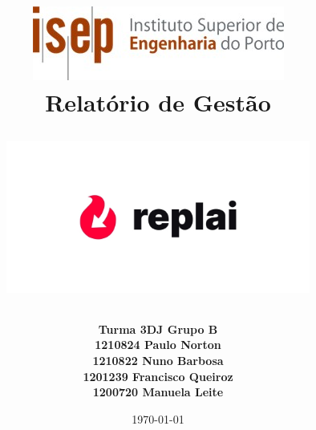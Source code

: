\documentclass[]{report}
\title{
    \includegraphics{images/isep.jpg} \\
    \vfill
    \LARGE\bfseries Relatório de Gestão\\
    \begin{figure}[h]
    \centering
    \includegraphics[width=10cm]{images/logo-black.jpg}
    \label{fig:replaiLogo}
    \end{figure}

    \vfill
    
    }
\author{
    \large\bfseries Turma 3DJ \textunderscore\space Grupo B \\
    1210824 \textunderscore\space Paulo Norton \\
    1210822 \textunderscore\space Nuno Barbosa \\
    1201239 \textunderscore\space Francisco Queiroz \\
    1200720 \textunderscore\space Manuela Leite\\
    }
\date{\today}
\begin{document}
\maketitle


\tableofcontents




\appendix


%
\listoffigures


\hypertarget{glossary}{\printglossaries}
\end{document}
